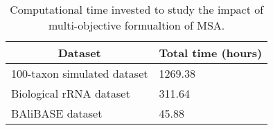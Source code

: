 \begin{table}[htbp]
	\small
	\centering
	\caption{Computational time invested to study the impact of multi-objective formualtion of MSA.}
\begin{tabular}{|l|l|}
	\hline 
	\multicolumn{1}{|c|}{Dataset} & \multicolumn{1}{c|}{Total time (hours)} \\ 
	\hline 
	100-taxon simulated dataset &  1269.38\\ 
	\hline 
	Biological rRNA dataset &  311.64\\ 
	\hline 
	BAliBASE dataset &  45.88\\ 
	\hline 
\end{tabular} 
\label{tab:time}%
\end{table}%